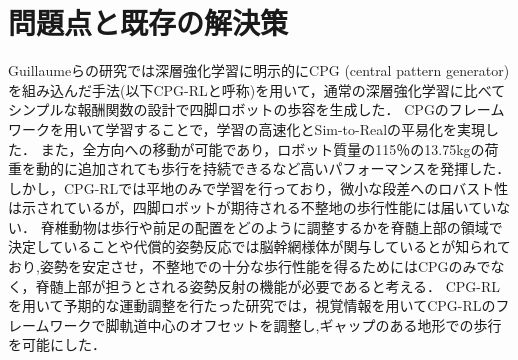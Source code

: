 \section{問題点と既存の解決策}
Guillaumeらの研究\cite{bellegarda2022cpgrl}では深層強化学習に明示的にCPG (central pattern generator)を組み込んだ手法(以下CPG-RLと呼称)を用いて，通常の深層強化学習に比べてシンプルな報酬関数の設計で四脚ロボットの歩容を生成した．
CPGのフレームワークを用いて学習することで，学習の高速化とSim-to-Realの平易化を実現した．
また，全方向への移動が可能であり，ロボット質量の115％の13.75kgの荷重を動的に追加されても歩行を持続できるなど高いパフォーマンスを発揮した．
しかし，CPG-RL\cite{bellegarda2022cpgrl}では平地のみで学習を行っており，微小な段差へのロバスト性は示されているが，四脚ロボットが期待される不整地の歩行性能には届いていない．
脊椎動物は歩行や前足の配置をどのように調整するかを脊髄上部の領域で決定していること\cite{DREW201525}や代償的姿勢反応では脳幹網様体が関与していると\cite{doi:10.1152/jn.91013.2008}が知られており,姿勢を安定させ，不整地での十分な歩行性能を得るためにはCPGのみでなく，脊髄上部が担うとされる姿勢反射の機能が必要であると考える．
CPG-RLを用いて予期的な運動調整を行たった研究\cite{cpgrl2,cpgrl3}では，視覚情報を用いてCPG-RLのフレームワークで脚軌道中心のオフセットを調整し,ギャップのある地形での歩行を可能にした．

